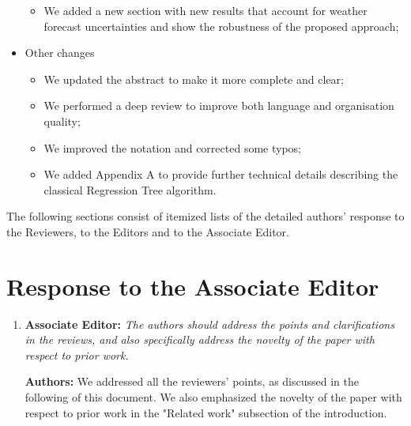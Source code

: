 \documentclass{article}
\begin{document}
\begin{itemize}
\begin{itemize}
		\item We added a new section with new results that account for weather forecast uncertainties and show the robustness of the proposed approach;

	\end{itemize}



	\item Other changes

	\begin{itemize}

		\item We updated the abstract to make it more complete and clear;

		\item We performed a deep review to improve both language and organisation quality;

		\item We improved the notation and corrected some typos;
		\item We added Appendix A to provide further technical details describing the classical Regression Tree algorithm.


	\end{itemize}



\end{itemize}



The following sections consist of itemized lists of the detailed authors' response to the Reviewers, to the Editors and to the Associate Editor.




\section{Response to the Associate Editor}



\begin{enumerate}

	\item \textbf{Associate Editor:} \textit{The authors should address the points and clarifications in the reviews, and also specifically address the novelty of the paper with respect to prior work.}

	

	\textbf{Authors:} We addressed all the reviewers' points, as discussed in the following of this document. We also emphasized the novelty of the paper with respect to prior work in the "Related work" subsection of the introduction.
	
\end{enumerate}
	
\end{document}
